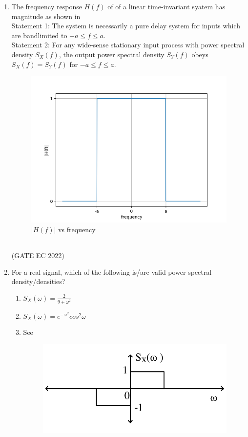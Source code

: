 \begin{enumerate}[label=\thechapter.\arabic*,ref=\thechapter.\theenumi]
\item The frequency response $H(f)$ of of a linear time-invariant syatem has magnitude as shown in \\
Statement 1: The system is necessarily a pure delay system for inputs which are bandlimited to $-a \leq f \leq a$.\\
Statement 2: For any wide-sense stationary input process with power spectral density $S_X(f)$, the output power spectral density $S_Y(f)$ obeys $S_X(f)=S_Y(f)$ for $-a \leq f \leq a$.\\
\begin{figure}[!ht]
\centering
\includegraphics[width=\columnwidth]{gate/EC/2022/23/figs/figure.png}
\caption{$|H(f)|$ vs frequency}
\end{figure}
\label{fig:23,2022}\\

\hfill (GATE EC 2022)
\item For a real signal, which of the following is/are valid power spectral density/densities?
\begin{enumerate}
\item \label{eq:30/2023/1}$S_X(\omega)=\frac{2}{9+\omega^2}$\\
\item \label{eq:30/2023/2}$S_X(\omega)=e^{-\omega^2}cos^2{\omega}$
\item See 
\begin{figure}[ht]
	\centering
	\includegraphics[width=\columnwidth]{gate/EC/2022/30/figs/fig1.png}

\end{figure}
\end{enumerate}
\end{enumerate}
